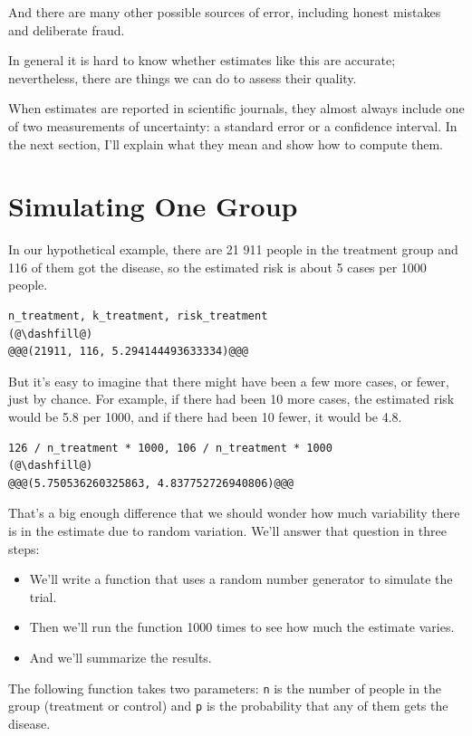 And there are many other possible sources of error, including honest
mistakes and deliberate fraud.

In general it is hard to know whether estimates like this are accurate;
nevertheless, there are things we can do to assess their quality.

When estimates are reported in scientific journals, they almost always
include one of two measurements of uncertainty: a standard error or a
confidence interval. In the next section, I'll explain what they mean
and show how to compute them.

\hypertarget{simulating-one-group}{%
\section{Simulating One Group}\label{simulating-one-group}}

In our hypothetical example, there are 21 911 people in the treatment
group and 116 of them got the disease, so the estimated risk is about 5
cases per 1000 people.

\begin{lstlisting}[]
n_treatment, k_treatment, risk_treatment
(@\dashfill@)
@@@(21911, 116, 5.294144493633334)@@@
\end{lstlisting}

But it's easy to imagine that there might have been a few more cases, or
fewer, just by chance. For example, if there had been 10 more cases, the
estimated risk would be 5.8 per 1000, and if there had been 10 fewer, it
would be 4.8.

\begin{lstlisting}[]
126 / n_treatment * 1000, 106 / n_treatment * 1000
(@\dashfill@)
@@@(5.750536260325863, 4.837752726940806)@@@
\end{lstlisting}

That's a big enough difference that we should wonder how much
variability there is in the estimate due to random variation. We'll
answer that question in three steps:

\begin{itemize}
\item
  We'll write a function that uses a random number generator to simulate
  the trial.
\item
  Then we'll run the function 1000 times to see how much the estimate
  varies.
\item
  And we'll summarize the results.
\end{itemize}

The following function takes two parameters: \passthrough{\lstinline!n!}
is the number of people in the group (treatment or control) and
\passthrough{\lstinline!p!} is the probability that any of them gets the
disease.


